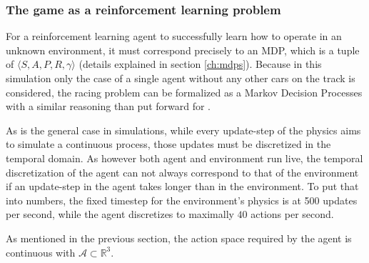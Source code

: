 \subsubsection{The game as a reinforcement learning problem}

For a reinforcement learning agent to successfully learn how to operate in an unknown environment, it must correspond precisely to an MDP, which is a tuple of $\langle S, A, P, R, \gamma \rangle$ (details explained in section \ref{ch:mdps}). Because in this simulation only the case of a single agent without any other cars on the track is considered, the racing problem can be formalized as a Markov Decision Processes with a similar reasoning than \citet[chapter 4]{wymann_torcs_2015} put forward for . 

As is the general case in simulations, while every update-step of the physics aims to simulate a continuous process, those updates must be discretized in the temporal domain. As however both agent and environment run live, the temporal discretization of the agent can not always correspond to that of the environment if an update-step in the agent takes longer than in the environment. To put that into numbers, the fixed timestep for the environment's physics is at 500 updates per second, while the agent discretizes to maximally $40$ actions per second.

As mentioned in the previous section, the action space required by the agent is continuous with $\mathcal{A} \subset \mathds{R}^3$. 

